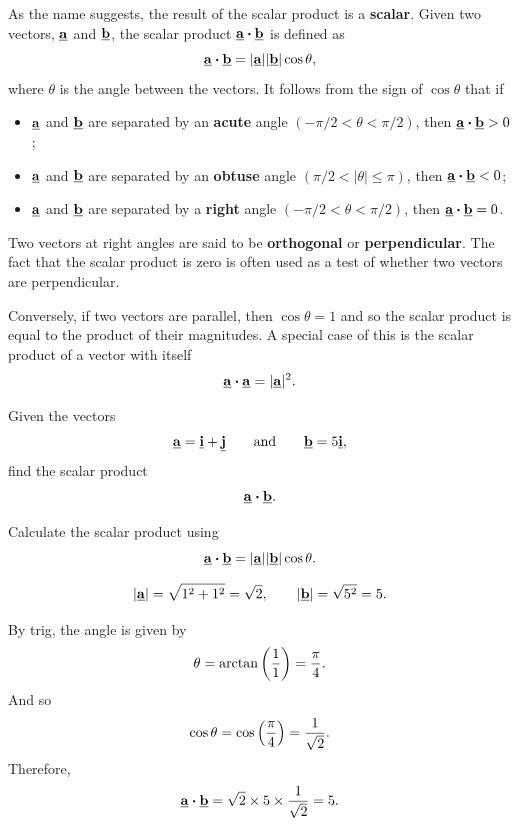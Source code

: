 As the name suggests, the result of the scalar product is a \textbf{scalar}. Given two vectors, $\underline{\mathbf{a}}$ and $\underline{\mathbf{b}}$, the scalar product $\underline{\mathbf{a}}\boldsymbol{\cdot}\underline{\mathbf{b}}$ is defined as
\begin{equation}
    \underline{\mathbf{a}}\boldsymbol{\cdot}\underline{\mathbf{b}}
=\lvert\underline{\mathbf{a}}\rvert\lvert\underline{\mathbf{b}}\rvert\cos\theta,
\end{equation}
where $\theta$ is the angle between the vectors. It follows from the sign of $\cos\theta$ that if
\begin{itemize}
    \item $\underline{\mathbf{a}}$ and $\underline{\mathbf{b}}$ are separated by an \textbf{acute} angle $(-\pi/2<\theta<\pi/2)$, then $\underline{\mathbf{a}}\boldsymbol{\cdot}\underline{\mathbf{b}} > 0$;
    \item $\underline{\mathbf{a}}$ and $\underline{\mathbf{b}}$ are separated by an \textbf{obtuse} angle $(\pi/2 < |\theta| \leq \pi)$, then $\underline{\mathbf{a}}\boldsymbol{\cdot}\underline{\mathbf{b}} < 0$;
    \item $\underline{\mathbf{a}}$ and $\underline{\mathbf{b}}$ are separated by a \textbf{right} angle $(-\pi/2<\theta<\pi/2)$, then $\underline{\mathbf{a}}\boldsymbol{\cdot}\underline{\mathbf{b}} = 0$.
\end{itemize}
Two vectors at right angles are said to be \textbf{orthogonal} or \textbf{perpendicular}. The fact that the scalar product is zero is often used as a test of whether two vectors are perpendicular. 

Conversely, if two vectors are parallel, then $\cos\theta=1$ and so the scalar product is equal to the product of their magnitudes. A special case of this is the scalar product of a vector with itself
\[
\underline{\mathbf{a}}\boldsymbol{\cdot}\underline{\mathbf{a}}=\lvert\underline{\mathbf{a}}\rvert^2.
\]

\begin{example}[Lecture]
Given the vectors
\[
\underline{\mathbf{a}}=\underline{\mathbf{i}}+\underline{\mathbf{j}}
\qquad\text{and}\qquad
\underline{\mathbf{b}}=5\underline{\mathbf{i}},
\]
find the scalar product
\[
\underline{\mathbf{a}}\boldsymbol{\cdot}\underline{\mathbf{b}}.
\]
\end{example}

\begin{solution}
Calculate the scalar product using
\[
\underline{\mathbf{a}}\boldsymbol{\cdot}\underline{\mathbf{b}}
=\lvert\underline{\mathbf{a}}\rvert\lvert\underline{\mathbf{b}}\rvert\cos\theta.
\]

\[
\lvert\underline{\mathbf{a}}\rvert=\sqrt{1^2+1^2}=\sqrt{2},
\qquad
\lvert\underline{\mathbf{b}}\rvert=\sqrt{5^2}=5.
\]

By trig, the angle is given by
\[
\theta=\arctan\left(\frac{1}{1}\right)=\frac{\pi}{4}.
\]
And so
\[
\cos\theta=\cos\left(\frac{\pi}{4}\right)=\frac{1}{\sqrt{2}}.
\]
Therefore,
\[
\underline{\mathbf{a}}\boldsymbol{\cdot}\underline{\mathbf{b}}
=\sqrt{2}\times5\times\frac{1}{\sqrt{2}}=5.
\]
\end{solution}

